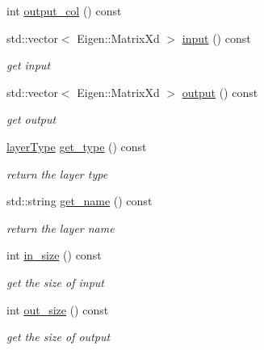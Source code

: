 \begin{DoxyCompactItemize}
int \hyperlink{class_layer_a81ddf9b360d331527813547112c146da}{output\+\_\+col} () const
\item 
std\+::vector$<$ Eigen\+::\+Matrix\+Xd $>$ \hyperlink{class_layer_a5213366d9a5a7317c5d40d9efdcfa623}{input} () const
\begin{DoxyCompactList}\small\item\em get input \end{DoxyCompactList}\item 
std\+::vector$<$ Eigen\+::\+Matrix\+Xd $>$ \hyperlink{class_layer_ad5ba1424bab1b683bf2e1894768ded90}{output} () const
\begin{DoxyCompactList}\small\item\em get output \end{DoxyCompactList}\item 
\hyperlink{class_layer_a823f18343920cda4f52dce36df6e851f}{layer\+Type} \hyperlink{class_layer_a0c280024394acfdf10c7b357a952f258}{get\+\_\+type} () const
\begin{DoxyCompactList}\small\item\em return the layer type \end{DoxyCompactList}\item 
std\+::string \hyperlink{class_layer_a1de20564b34204c4b3e985f48c69d17f}{get\+\_\+name} () const
\begin{DoxyCompactList}\small\item\em return the layer name \end{DoxyCompactList}\item 
int \hyperlink{class_layer_af2aa113e9b7938188d8da55b6950d0e5}{in\+\_\+size} () const
\begin{DoxyCompactList}\small\item\em get the size of input \end{DoxyCompactList}\item 
int \hyperlink{class_layer_a10515e993c8de900ad32fa1884b5915f}{out\+\_\+size} () const
\begin{DoxyCompactList}\small\item\em get the size of output \end{DoxyCompactList}\end{DoxyCompactItemize}
